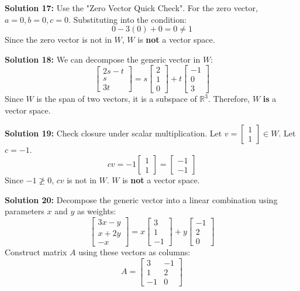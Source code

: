 \documentclass[11pt]{article}
\begin{document}
\vspace{0.3cm}
\textbf{Solution 17:} Use the "Zero Vector Quick Check". For the zero vector, $a=0, b=0, c=0$. Substituting into the condition:
$$ 0 - 3(0) + 0 = 0 \neq 1 $$
Since the zero vector is not in $W$, $W$ is \textbf{not} a vector space.

\vspace{0.3cm}
\textbf{Solution 18:} We can decompose the generic vector in $W$:
$$ \begin{bmatrix} 2s - t \\ s \\ 3t \end{bmatrix} = s \begin{bmatrix} 2 \\ 1 \\ 0 \end{bmatrix} + t \begin{bmatrix} -1 \\ 0 \\ 3 \end{bmatrix} $$
Since $W$ is the span of two vectors, it is a subspace of $\mathbb{R}^3$. Therefore, $W$ \textbf{is} a vector space.

\vspace{0.3cm}
\textbf{Solution 19:} Check closure under scalar multiplication. Let $v = \begin{bmatrix} 1 \\ 1 \end{bmatrix} \in W$. Let $c = -1$.
$$ cv = -1 \begin{bmatrix} 1 \\ 1 \end{bmatrix} = \begin{bmatrix} -1 \\ -1 \end{bmatrix} $$
Since $-1 \not\ge 0$, $cv$ is not in $W$. $W$ is \textbf{not} a vector space.

\vspace{0.3cm}
\textbf{Solution 20:} Decompose the generic vector into a linear combination using parameters $x$ and $y$ as weights:
$$ \begin{bmatrix} 3x - y \\ x + 2y \\ -x \end{bmatrix} = x \begin{bmatrix} 3 \\ 1 \\ -1 \end{bmatrix} + y \begin{bmatrix} -1 \\ 2 \\ 0 \end{bmatrix} $$
Construct matrix $A$ using these vectors as columns:
$$ A = \begin{bmatrix} 3 & -1 \\ 1 & 2 \\ -1 & 0 \end{bmatrix} $$
\end{document}
